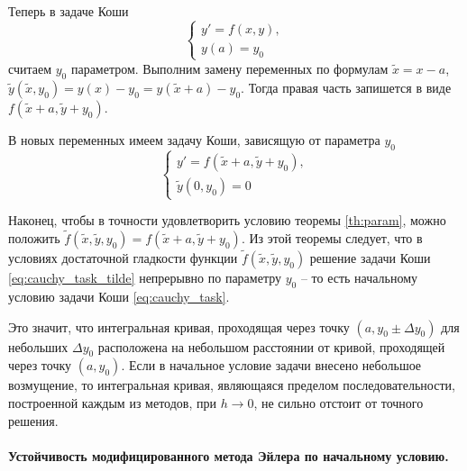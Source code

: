 \documentclass[a4paper, 12pt]{article}
\theoremstyle{mythm}
\begin{document}
	Теперь в задаче Коши
	\begin{equation}
		\begin{cases} \label{eq:cauchy_task_x0}
			y' = f(x,y),\\
			y(a) = y_0
		\end{cases}
	\end{equation} считаем $y_0$ параметром. Выполним замену переменных по формулам $\widetilde{x} = x - a$, $\widetilde{y}(\widetilde{x}, y_0) = y(x) - y_0 = y(\widetilde{x} + a) - y_0$. Тогда правая часть запишется в виде $f(\widetilde{x} + a, \widetilde{y} + y_0)$.

	В новых переменных имеем задачу Коши, зависящую от параметра $y_0$
	\begin{equation}
		\begin{cases} \label{eq:cauchy_task_tilde}
			y' = f(\widetilde{x} + a, \widetilde{y} + y_0),\\
			\widetilde{y}(0, y_0) = 0
		\end{cases}
	\end{equation}

	Наконец, чтобы в точности удовлетворить условию теоремы \ref{th:param}, можно положить $\widetilde{f}(\widetilde{x}, \widetilde{y}, y_0) = f(\widetilde{x} + a, \widetilde{y} + y_0)$. Из этой теоремы следует, что в условиях достаточной гладкости функции $\widetilde{f}(\widetilde{x}, \widetilde{y}, y_0)$ решение задачи Коши \eqref{eq:cauchy_task_tilde} непрерывно по параметру $y_0$ -- то есть начальному условию задачи Коши \eqref{eq:cauchy_task}.
	
	Это значит, что интегральная кривая, проходящая через точку $(a, y_0 \pm \Delta y_0)$ для небольших $\Delta y_0$ расположена на небольшом расстоянии от кривой, проходящей через точку $(a, y_0)$. Если в начальное условие задачи внесено небольшое возмущение, то интегральная кривая, являющаяся пределом последовательности, построенной каждым из методов, при $h \rightarrow 0$, не сильно отстоит от точного решения.
	
	\paragraph{Устойчивость модифицированного метода Эйлера по начальному условию.}
	
\end{document}
